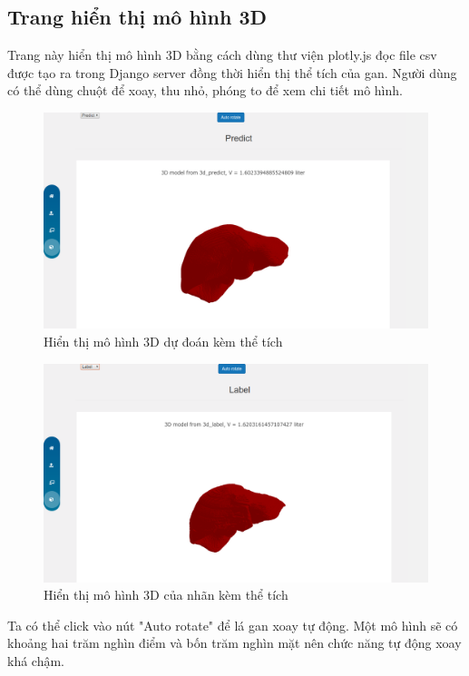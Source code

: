 \subsection{Trang hiển thị mô hình 3D}
Trang này hiển thị mô hình 3D bằng cách dùng thư viện plotly.js đọc file csv được tạo ra trong Django server đồng thời hiển thị thể tích của gan. Người dùng có thể dùng chuột để xoay, thu nhỏ, phóng to để xem chi tiết mô hình.
\begin{figure}[h]
\centering
    \includegraphics[totalheight=7cm]{Images/app_3dpredict.png}
    \caption{Hiển thị mô hình 3D dự đoán kèm thể tích}
    \label{skip_conn}
\end{figure}
\begin{figure}[h]
\centering
    \includegraphics[totalheight=7cm]{Images/app_3dlabel.png}
    \caption{Hiển thị mô hình 3D của nhãn kèm thể tích}
    \label{skip_conn}
\end{figure}

Ta có thể click vào nút "Auto rotate" để lá gan xoay tự động. Một mô hình sẽ có khoảng hai trăm nghìn điểm và bốn trăm nghìn mặt nên chức năng tự động xoay khá chậm.
